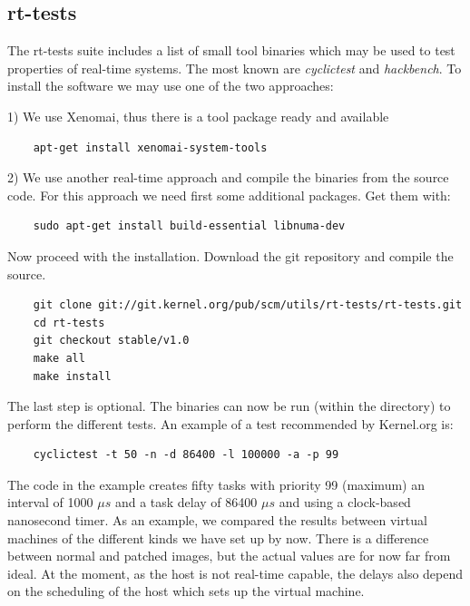 \documentclass[]{scrartcl}
\begin{document}
\subsection{rt-tests}

The rt-tests suite includes a list of small tool binaries which may be used to test properties of real-time systems. The most known are \textit{cyclictest} and \textit{hackbench}. To install the software we may use one of the two approaches:

1) We use Xenomai, thus there is a tool package ready and available

\begin{verbatim}
	apt-get install xenomai-system-tools
\end{verbatim}

2) We use another real-time approach and compile the binaries from the source code.
For this approach we need first some additional packages. Get them with:

\begin{verbatim}
	sudo apt-get install build-essential libnuma-dev
\end{verbatim}

Now proceed with the installation. Download the git repository and compile the source.

\begin{verbatim}
	git clone git://git.kernel.org/pub/scm/utils/rt-tests/rt-tests.git
	cd rt-tests
	git checkout stable/v1.0
	make all
	make install
\end{verbatim}

The last step is optional. The binaries can now be run (within the directory) to perform the different tests. An example of a test recommended by Kernel.org is: 

\begin{verbatim}
	cyclictest -t 50 -n -d 86400 -l 100000 -a -p 99
\end{verbatim}

The code in the example creates fifty tasks with priority 99 (maximum) an interval of 1000 $\mu s$ and a task delay of 86400 $\mu s$ and using a clock-based nanosecond timer. 
As an example, we compared the results between virtual machines of the different kinds we have set up by now. There is a difference between normal and patched images, but the actual values are for now far from ideal. At the moment, as the host is not real-time capable, the delays also depend on the scheduling of the host which sets up the virtual machine. 
\end{document}
